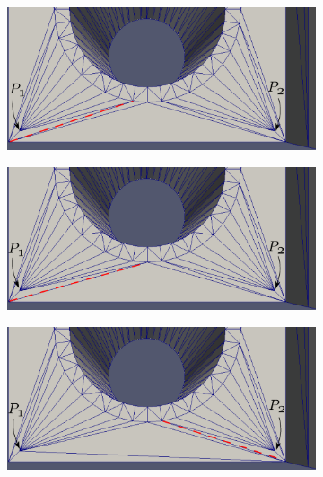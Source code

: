 \documentclass[conf]{new-aiaa}
\begin{document}
\begin{figure}[hbt!]
\centering
\begin{subfigure}{0.4\textwidth}
  \centering
  \includegraphics[width=.9\linewidth]{force-swapping-edge-recovery/initial-edited.eps}
  \caption{}
  \label{force-swap1}
\end{subfigure}%
\begin{subfigure}{.4\textwidth}
  \centering
  \includegraphics[width=.9\linewidth]{force-swapping-edge-recovery/swap1-edited.eps}
  \caption{}
  \label{force-swap2}
\end{subfigure}
\begin{subfigure}{.4\textwidth}
  \centering
  \includegraphics[width=.9\linewidth]{force-swapping-edge-recovery/swap2-edited.eps}
  \caption{}
  \label{force-swap3}
\end{subfigure}%
\begin{subfigure}{.4\textwidth}
  \centering

\end{subfigure}
\end{figure}
\end{document}
